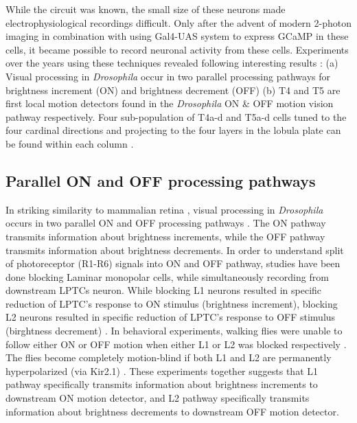 While the circuit was known, the small size of these neurons made electrophysiological recordings difficult. Only after the advent of modern 2-photon imaging in combination with using Gal4-UAS system to express GCaMP in these cells, it became possible to record neuronal activity from these cells. Experiments over the years using these techniques revealed following interesting results : (a) Visual processing in \textit{Drosophila} occur in two parallel processing pathways for brightness increment (ON) and brightness decrement (OFF) \parencite{Joesch2010, Joesch2013, Strother2014, Eichner2011, Behnia2014} (b) T4 and T5 are first local motion detectors found in the \textit{Drosophila} ON \& OFF motion vision pathway respectively. Four sub-population of T4a-d and T5a-d cells tuned to the four cardinal directions and projecting to the four layers in the lobula plate can be found within each column \parencite{Maisak2013}. 


\subsection{Parallel ON and OFF processing pathways}
In striking similarity to mammalian retina \parencite{Masland2012}, visual processing in \textit{Drosophila} occurs in two parallel ON and OFF processing pathways \parencite{Borst2015}. The ON pathway transmits information about brightness increments, while the OFF pathway transmits information about brightness decrements. In order to understand split of photoreceptor (R1-R6) signals into ON and OFF pathway, studies have been done blocking Laminar monopolar cells, while simultaneously recording from downstream LPTCs neuron. While blocking L1 neurons resulted in specific reduction of LPTC's response to ON stimulus (brightness increment), blocking L2 neurons resulted in specific reduction of LPTC's response to OFF stimulus (birghtness decrement) \parencite{Joesch2010}. In behavioral experiments, walking flies were unable to follow either ON or OFF motion when either L1 or L2 was blocked respectively \parencite{Clark2011, Maisak2013}. The flies become completely motion-blind if both L1 and L2 are permanently hyperpolarized (via Kir2.1) \parencite{Tuthill2013, Bahl2013}. These experiments together suggests that L1 pathway specifically transmits information about brightness increments to downstream ON motion detector, and L2 pathway specifically transmits information about brightness decrements to downstream OFF motion detector. 

